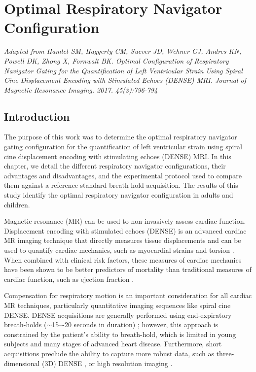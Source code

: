 \chapter{Optimal Respiratory Navigator Configuration}

\begin{center}
	\textit{Adapted from Hamlet SM, Haggerty CM, Suever JD, Wehner GJ, Andres KN, Powell DK, Zhong X, Fornwalt BK. Optimal Configuration of Respiratory Navigator Gating for the Quantification of Left Ventricular Strain Using Spiral Cine Displacement Encoding with Stimulated Echoes (DENSE) MRI. Journal of Magnetic Resonance Imaging. 2017. 45(3):796-794}
\end{center}

\section{Introduction}
	The purpose of this work was to determine the optimal respiratory navigator gating configuration for the quantification of left ventricular strain using spiral cine displacement encoding with stimulating echoes (DENSE) MRI.  In this chapter, we detail the different respiratory navigator configurations, their advantages and disadvantages, and the experimental protocol used to compare them against a reference standard breath-hold acquisition. The results of this study identify the optimal respiratory navigator configuration in adults and children.
	
	Magnetic resonance (MR) can be used to non-invasively assess cardiac function. Displacement encoding with stimulated echoes (DENSE) is an advanced cardiac MR imaging technique that directly measures tissue displacements and can be used to quantify cardiac mechanics, such as myocardial strains and torsion \cite{Aletras1999b,Aletras1999c}. When combined with clinical risk factors, these measures of cardiac mechanics have been shown to be better predictors of mortality than traditional measures of cardiac function, such as ejection fraction \cite{Stanton2009}.
	 
	Compensation for respiratory motion is an important consideration for all cardiac MR techniques, particularly quantitative imaging sequences like spiral cine DENSE. DENSE acquisitions are generally performed using end-expiratory breath-holds ($\sim$15–-20 seconds in duration) \cite{Kim2004,Zhong2006a,Ernande2012,Zhong2010a,Aletras2005,Spottiswoode2007,Young2012c}; however, this approach is constrained by the patient's ability to breath-hold, which is limited in young subjects and many stages of advanced heart disease. Furthermore, short acquisitions preclude the ability to capture more robust data, such as three-dimensional (3D) DENSE \cite{Zhong2010a,Kar2014,Auger2012}, or high resolution imaging \cite{Wehner2014}.
	
